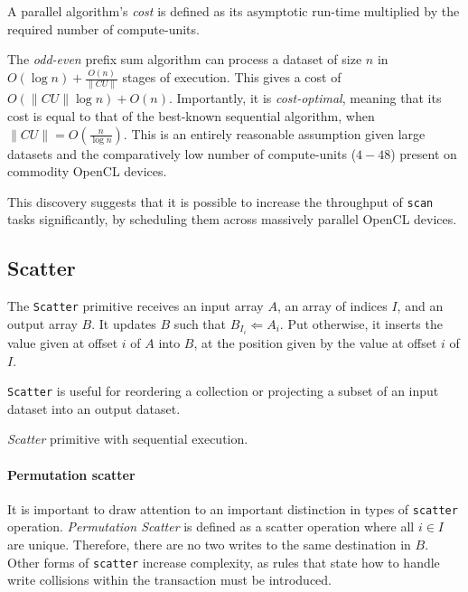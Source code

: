 A parallel algorithm's \emph{cost} is defined as its asymptotic run-time multiplied by the required number of compute-units.


The \emph{odd-even} prefix sum algorithm can process a dataset of size $n$ in $O(\log n) + \frac{O(n)}{\|CU\|}$ stages of execution. This gives a cost of $O(\|CU\| \log n) + O(n)$.
Importantly, it is \emph{cost-optimal}, meaning that its cost is equal to that of the best-known sequential algorithm, when $\|CU\| = O(\frac{n}{\log n})$. This is an entirely reasonable assumption given large datasets and the comparatively low number of compute-units ($4-48$) present on commodity \ac{OpenCL} devices.

This discovery suggests that it is possible to increase the throughput of \verb|scan| tasks significantly, by scheduling them across massively parallel \ac{OpenCL} devices.

\subsection{Scatter}
The \verb|Scatter| primitive receives an input array $A$, an array of indices $I$, and an output array $B$. It updates $B$ such that $B_{I_i} \Leftarrow A_i$. Put otherwise, it inserts the value given at offset $i$ of $A$ into $B$, at the position given by the value at offset $i$ of $I$.

\verb|Scatter| is useful for reordering a collection or projecting a subset of an input dataset into an output dataset.

\begin{algorithm}
  \caption{\emph{Scatter} primitive with sequential execution.}
  \label{alg:seqscatter}

  \begin{algorithmic}
      \EndFor
    \EndFunction
  \end{algorithmic}
\end{algorithm}

\paragraph*{Permutation scatter}
It is important to draw attention to an important distinction in types of \verb|scatter| operation. \emph{Permutation Scatter} is defined as a scatter operation where all $i \in I$ are unique. Therefore, there are no two writes to the same destination in $B$. Other forms of \verb|scatter| increase complexity, as rules that state how to handle write collisions within the transaction must be introduced.

